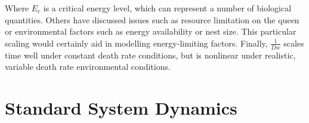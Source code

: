 \documentclass[12pt]{report}
\begin{document}
Where $E_c$  is a critical energy level, which can represent a number of biological quantities. Others have discussed issues such as resource limitation on the queen \cite{mitesser2007optimal} or environmental factors such as energy availability or nest size. This particular scaling would certainly aid in modelling energy-limiting factors. Finally, $\frac{1}{Dw}$ scales time well under constant death rate conditions, but is nonlinear under realistic, variable death rate environmental conditions.

\section*{Standard System Dynamics}

\end{document}
